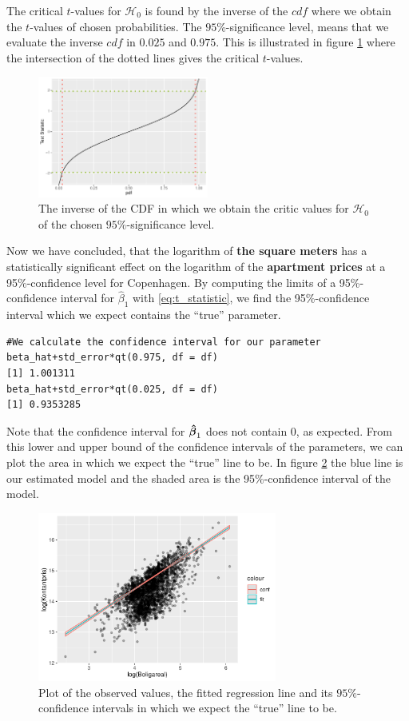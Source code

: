 The critical $t$-values for $\mathcal{H}_0$ is found by the inverse of the $cdf$ where we obtain the $t$-values of chosen probabilities. 
The $95\%$-significance level, means that we evaluate the inverse $cdf$ in $0.025$ and $0.975$. 
This is illustrated in figure \ref{fig:CDF_inverse} where the intersection of the dotted lines gives the critical $t$-values.
\begin{figure}[H]
    \centering
    \includegraphics[width = 0.5\textwidth]{figures/Nanna/Inverse_CDF.pdf}
    \caption{The inverse of the CDF in which we obtain the critic values for $\mathcal{H}_0$ of the chosen $95\%$-significance level.}
    \label{fig:CDF_inverse}
\end{figure}
Now we have concluded, that the logarithm of \textbf{the square meters} has a statistically significant effect on the logarithm of the \textbf{apartment prices} at a 95\%-confidence level for Copenhagen. 
By computing the limits of a 95\%-confidence interval for $\hat{\beta}_1$ with \eqref{eq:t_statistic}, we find the 95\%-confidence interval which we expect contains the ``true'' parameter.
\begin{lstlisting}
#We calculate the confidence interval for our parameter
beta_hat+std_error*qt(0.975, df = df)
[1] 1.001311
beta_hat+std_error*qt(0.025, df = df)
[1] 0.9353285
\end{lstlisting}
Note that the confidence interval for $\operatorname{\boldsymbol{\hat{\beta}}}_1$ does not contain 0, as expected.
From this lower and upper bound of the confidence intervals of the parameters, we can plot the area in which we expect the ``true'' line to be. 
In figure \ref{fig:t_distributionplot2} the blue line is our estimated model and the shaded area is the 95\%-confidence interval of the model. 
\begin{figure}[H]
    \centering
    \includegraphics[width = 0.7\textwidth]{figures/Nanna/Confidence_interval.pdf}
    \caption{Plot of the observed values, the fitted regression line and its $95\%$-confidence intervals in which we expect the ``true'' line to be.}
    \label{fig:t_distributionplot2}
\end{figure}

